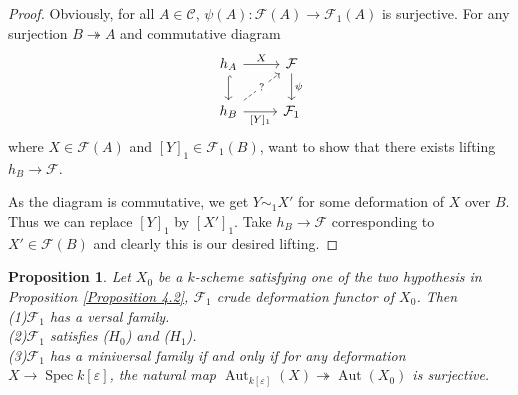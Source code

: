 \documentclass{ctexart}
\newtheorem{proposition}{Proposition}[section]
\newcommand{\aut}{\operatorname{Aut}}
\newcommand{\spec}{\operatorname{Spec}}
\begin{document}
\begin{proof}
    Obviously, for all $A\in \mathcal{C}$, $\psi(A): \mathcal{F}(A) \rightarrow \mathcal{F}_{1}(A)$ is surjective.
    For any surjection $B \twoheadrightarrow A$ and commutative diagram
    \begin{equation}
        \begin{tikzcd}
            h_{A} \arrow[r, "X"] \arrow[d, hookrightarrow] &
            \mathcal{F} \arrow[d, "\psi"] \\
            h_{B} \arrow[ur, dashrightarrow, "?" description] \arrow[r, "{[Y]_{1}}" swap] &
            \mathcal{F}_{1}
        \end{tikzcd}
    \end{equation}
    where $X\in \mathcal{F}(A)$ and $[Y]_{1}\in \mathcal{F}_{1}(B)$,
    want to show that there exists lifting $h_{B} \rightarrow \mathcal{F}$.
    \par
    As the diagram is commutative, we get $Y \sim_{1} X'$ for some deformation of $X$ over $B$. 
    Thus we can replace $[Y]_{1}$ by $[X']_{1}$.
    Take $h_{B} \rightarrow \mathcal{F}$ corresponding to $X'\in \mathcal{F}(B)$ and clearly this is our desired lifting.
\end{proof}
\begin{proposition}
    Let $X_{0}$ be a $k$-scheme satisfying one of the two hypothesis in Proposition \ref{Proposition 4.2}, $\mathcal{F}_{1}$ crude deformation functor of $X_{0}$.
    Then \\
    (1)$\mathcal{F}_{1}$ has a versal family. \\
    (2)$\mathcal{F}_{1}$ satisfies ($H_{0}$) and ($H_{1}$). \\
    (3)$\mathcal{F}_{1}$ has a miniversal family if and only if for any deformation $X \rightarrow \spec k[\varepsilon]$,
    the natural map $\aut_{k[\varepsilon]}(X) \twoheadrightarrow \aut(X_{0})$ is surjective.
    \label{Proposition 4.3}
\end{proposition}
\end{document}
